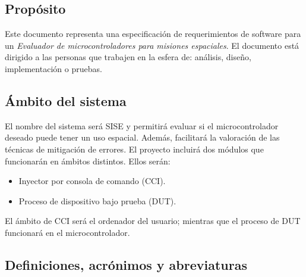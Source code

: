 \documentclass[
11pt, %
codirector, %
]{charter}
\begin{document}
\subsection{Propósito}
\label{sub:proposito}

Este documento representa una especificación de requerimientos de software para un \emph{Evaluador de microcontroladores para misiones espaciales}.
El documento está dirigido a las personas que trabajen en la esfera de: análisis, diseño, implementación o pruebas.

\subsection{Ámbito del sistema}
\label{sub:ambito}

El nombre del sistema será SISE y permitirá evaluar si el microcontrolador deseado puede tener un uso espacial.
Además, facilitará la valoración de las técnicas de mitigación de errores.
El proyecto incluirá dos módulos que funcionarán en ámbitos distintos.
Ellos serán:

\begin{itemize}
	\item Inyector por consola de comando (CCI).
	\item Proceso de dispositivo bajo prueba (DUT).
\end{itemize}

El ámbito de CCI será el ordenador del usuario; mientras que el proceso de DUT funcionará en el microcontrolador.

\subsection{Definiciones, acrónimos y abreviaturas}
\label{sub:definiciones}
\end{document}
